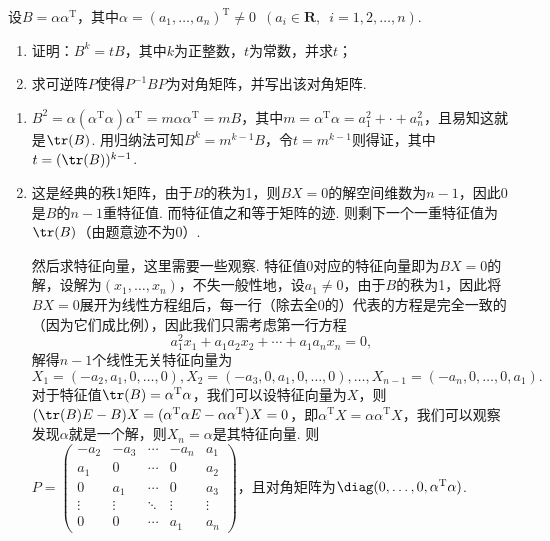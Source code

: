 \begin{exercise}
\begin{exgroup}
        \item 设$B=\alpha\alpha^\mathrm{T}$，其中$\alpha=(a_1,\ldots,a_n)^\mathrm{T}\neq 0\enspace(a_i\in\mathbf{R},\enspace i=1,2,\ldots,n)$.
        \begin{enumerate}
            \item 证明：$B^k=tB$，其中$k$为正整数，$t$为常数，并求$t$；

            \item 求可逆阵$P$使得$P^{-1}BP$为对角矩阵，并写出该对角矩阵.
        \end{enumerate}
        \begin{answer}
            \begin{enumerate}
                \item $B^2=\alpha(\alpha^\mathrm{T}\alpha)\alpha^\mathrm{T}=m\alpha\alpha^\mathrm{T}=mB$，其中$m=\alpha^\mathrm{T}\alpha=a_1^2+\cdot+a_n^2$，且易知这就是$\tr(B)$. 用归纳法可知$B^k=m^{k-1}B$，令$t=m^{k-1}$则得证，其中$t=(\tr(B))^{k-1}$.

                \item 这是经典的秩1矩阵，由于$B$的秩为1，则$BX=0$的解空间维数为$n-1$，因此0是$B$的$n-1$重特征值. 而特征值之和等于矩阵的迹. 则剩下一个一重特征值为$\tr(B)$（由题意迹不为0）.

                      然后求特征向量，这里需要一些观察. 特征值0对应的特征向量即为$BX=0$的解，设解为$(x_1,\ldots,x_n)$，不失一般性地，设$a_1\neq 0$，由于$B$的秩为1，因此将$BX=0$展开为线性方程组后，每一行（除去全0的）代表的方程是完全一致的（因为它们成比例），因此我们只需考虑第一行方程
                      \[a_1^2x_1+a_1a_2x_2+\cdots+a_1a_nx_n=0,\]
                      解得$n-1$个线性无关特征向量为
                      \[X_1=(-a_2,a_1,0,\ldots,0),X_2=(-a_3,0,a_1,0,\ldots,0),\ldots,X_{n-1}=(-a_n,0,\ldots,0,a_1).\]
                      对于特征值$\tr(B)=\alpha^\mathrm{T}\alpha$，我们可以设特征向量为$X$，则$(\tr(B)E-B)X=(\alpha^\mathrm{T}\alpha E-\alpha\alpha^\mathrm{T})X=0$，即$\alpha^\mathrm{T}X=\alpha\alpha^\mathrm{T}X$，我们可以观察发现$\alpha$就是一个解，则$X_n=\alpha$是其特征向量. 则$P=\begin{pmatrix}
                              -a_2 & -a_3 & \cdots & -a_n & a_1 \\ a_1 & 0 & \cdots & 0 & a_2 \\ 0 & a_1 & \cdots & 0 & a_3 \\ \vdots & \vdots & \ddots & \vdots & \vdots \\ 0 & 0 & \cdots & a_1 & a_n
                          \end{pmatrix}$，且对角矩阵为$\diag(0,\ldots,0,\alpha^\mathrm{T}\alpha)$.
            \end{enumerate}
        \end{answer}


\end{exgroup}
\end{exercise}
